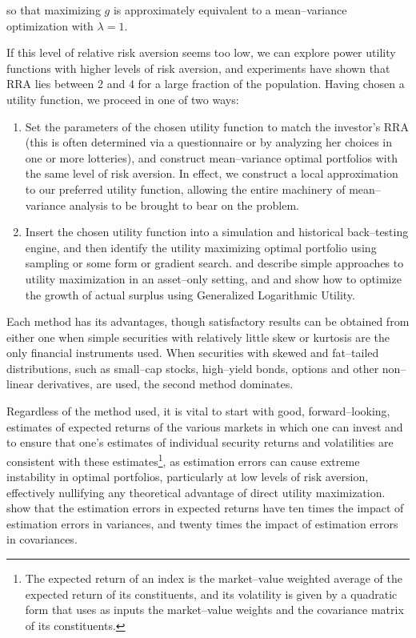 \documentclass[graybox,envcountchap,sectrefs]{svmono}\usepackage[]{graphicx}\usepackage[]{xcolor}
\begin{document}
\begin{appendices}
so that maximizing $g$ is approximately equivalent to a mean--variance
optimization with $\lambda=1$.

If this level of relative risk aversion seems too low, we can explore
power utility functions with higher levels of risk aversion, and experiments
have shown that RRA lies between 2 and 4 for a large fraction of the
population. Having chosen a utility function, we proceed in one of
two ways:
\begin{enumerate}
\item Set the parameters of the chosen utility function to match the investor's
RRA (this is often determined via a questionnaire or by analyzing
her choices in one or more lotteries), and construct mean--variance
optimal portfolios with the same level of risk aversion. In effect,
we construct a local approximation to our preferred utility function,
allowing the entire machinery of mean--variance analysis to be brought
to bear on the problem.
\item Insert the chosen utility function into a simulation and historical
back--testing engine, and then identify the utility maximizing optimal
portfolio using sampling or some form or gradient search. \citet{AdlerKritzman2007}
and \citet{Sharpe2007} describe simple approaches to utility maximization
in an asset--only setting, and \citet{Wilcox2019} and \citet{WilcoxSatchell2021}
show how to optimize the growth of actual surplus using Generalized
Logarithmic Utility.
\end{enumerate}
Each method has its advantages, though satisfactory results can be
obtained from either one when simple securities with relatively little
skew or kurtosis are the only financial instruments used. When securities
with skewed and fat--tailed distributions, such as small--cap stocks,
high--yield bonds, options and other non--linear derivatives, are
used, the second method dominates. 

Regardless of the method used, it is vital to start with good, forward--looking,
estimates of expected returns of the various markets in which one
can invest and to ensure that one's estimates of individual security
returns and volatilities are consistent with these estimates\footnote{The expected return of an index is the market--value weighted average
of the expected return of its constituents, and its volatility is
given by a quadratic form that uses as inputs the market--value weights
and the covariance matrix of its constituents.}, as estimation errors can cause extreme instability in optimal portfolios,
particularly at low levels of risk aversion, effectively nullifying
any theoretical advantage of direct utility maximization. \citet{ChopraZiemba1993}
show that the estimation errors in expected returns have ten times
the impact of estimation errors in variances, and twenty times the
impact of estimation errors in covariances. 

\end{appendices}

\pagebreak{}

\begin{flushleft}
\printbibliography
\par\end{flushleft}

\newpage
\end{document}
